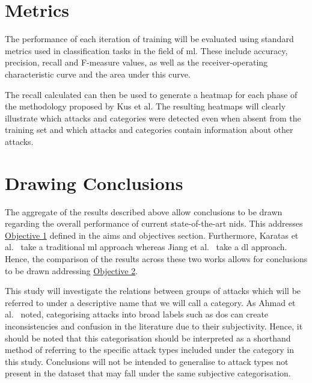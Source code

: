 \section{Metrics}%
\label{sec:metrics}

The performance of each iteration of training will be evaluated using standard
metrics used in classification tasks in the field of \gls{ml}. These include
accuracy, precision, recall and F-measure values, as well as the
receiver-operating characteristic curve and the area under this
curve.~\cite{metrics}

The recall calculated can then be used to generate a heatmap for each phase of
the methodology proposed by Kus et al. The resulting heatmaps will clearly
illustrate which attacks and categories were detected even when absent from the
training set and which attacks and categories contain information about other
attacks.

\section{Drawing Conclusions}%
\label{sec:conclusions}

The aggregate of the results described above allow conclusions to be drawn
regarding the overall performance of current state-of-the-art \gls{nids}. This
addresses \hyperlink{obj}{Objective 1} defined in the aims and objectives section.
Furthermore, Karatas et al.~\cite{Karatas} take a traditional \gls{ml} approach
whereas Jiang et al.~\cite{Jiang} take a \gls{dl} approach. Hence, the
comparison of the results across these two works allows for conclusions to be
drawn addressing \hyperlink{obj}{Objective 2}.

This study will investigate the relations between groups of attacks which will
be referred to under a descriptive name that we will call a category. As Ahmad
et al.~\cite{zero-day} noted, categorising attacks into broad labels such as
\gls{dos} can create inconsistencies and confusion in the literature due to
their subjectivity. Hence, it should be noted that this categorisation should
be interpreted as a shorthand method of referring to the specific attack types
included under the category in this study. Conclusions will not be intended to
generalise to attack types not present in the dataset that may fall under the
same subjective categorisation.
